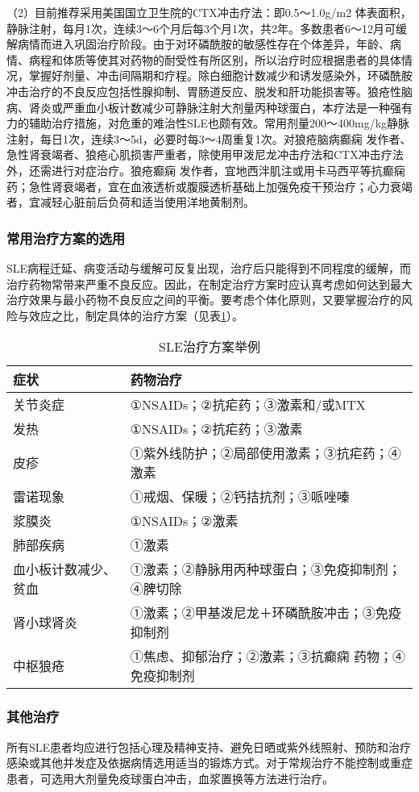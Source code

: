 （2）目前推荐采用美国国立卫生院的CTX冲击疗法：即0.5～1.0g/m{2}
体表面积，静脉注射，每月1次，连续3～6个月后每3个月1次，共2年。多数患者6～12月可缓解病情而进入巩固治疗阶段。由于对环磷酰胺的敏感性存在个体差异，年龄、病情、病程和体质等使其对药物的耐受性有所区别，所以治疗时应根据患者的具体情况，掌握好剂量、冲击间隔期和疗程。除白细胞计数减少和诱发感染外，环磷酰胺冲击治疗的不良反应包括性腺抑制、胃肠道反应、脱发和肝功能损害等。狼疮性脑病、肾炎或严重血小板计数减少可静脉注射大剂量丙种球蛋白，本疗法是一种强有力的辅助治疗措施，对危重的难治性SLE也颇有效。常用剂量200～400mg/kg静脉注射，每日1次，连续3～5d，必要时每3～4周重复1次。对狼疮脑病癫痫
发作者、急性肾衰竭者、狼疮心肌损害严重者，除使用甲泼尼龙冲击疗法和CTX冲击疗法外，还需进行对症治疗。狼疮癫痫
发作者，宜地西泮肌注或用卡马西平等抗癫痫
药；急性肾衰竭者，宜在血液透析或腹膜透析基础上加强免疫干预治疗；心力衰竭者，宜减轻心脏前后负荷和适当使用洋地黄制剂。

\subsubsection{常用治疗方案的选用}

SLE病程迁延、病变活动与缓解可反复出现，治疗后只能得到不同程度的缓解，而治疗药物常带来严重不良反应。因此，在制定治疗方案时应认真考虑如何达到最大治疗效果与最小药物不良反应之间的平衡。要考虑个体化原则，又要掌握治疗的风险与效应之比，制定具体的治疗方案（见表\ref{tab16-5}）。

\begin{longtable}[]{p{5cm}p{5cm}}
    \caption{SLE治疗方案举例}
    \label{tab16-5}\\
    \toprule
    症状                 & 药物治疗\tabularnewline
    \midrule
    \endhead
    关节炎症             & ①NSAIDs；②抗疟药；③激素和/或MTX\tabularnewline
    发热                 & ①NSAIDs；②抗疟药；③激素\tabularnewline
    皮疹                 & ①紫外线防护；②局部使用激素；③抗疟药；④激素\tabularnewline
    雷诺现象             & ①戒烟、保暖；②钙拮抗剂；③哌唑嗪\tabularnewline
    浆膜炎               & ①NSAIDs；②激素\tabularnewline
    肺部疾病             & ①激素\tabularnewline
    血小板计数减少、贫血 &
    ①激素；②静脉用丙种球蛋白；③免疫抑制剂；④脾切除\tabularnewline
    肾小球肾炎           &
    ①激素；②甲基泼尼龙＋环磷酰胺冲击；③免疫抑制剂\tabularnewline
    中枢狼疮             &
    ①焦虑、抑郁治疗；②激素；③抗癫痫
    药物；④免疫抑制剂\tabularnewline
    \bottomrule
\end{longtable}

\subsubsection{其他治疗}

所有SLE患者均应进行包括心理及精神支持、避免日晒或紫外线照射、预防和治疗感染或其他并发症及依据病情选用适当的锻炼方式。对于常规治疗不能控制或重症患者，可选用大剂量免疫球蛋白冲击，血浆置换等方法进行治疗。